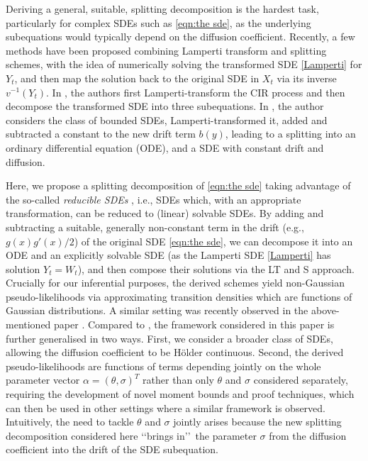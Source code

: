 \documentclass[a4paper,12pt]{article}
\numberwithin{equation}{section}
\theoremstyle{plain}
\theoremstyle{definition}
\begin{document}
Deriving a general, suitable, splitting decomposition is the hardest task, particularly for complex SDEs such as \eqref{eqn:the sde}, as the underlying subequations would typically depend on the diffusion coefficient. 
Recently, a few methods have been proposed combining Lamperti transform and splitting schemes, with the idea of numerically solving the transformed SDE \eqref{Lamperti} for $Y_t$, and then map the solution back to the original SDE in $X_t$ via its inverse $v^{-1}(Y_t)$. 
In \cite{kelly_adaptive_2023}, the authors first Lamperti-transform the CIR process and then decompose the transformed SDE into three subequations. In \cite{ulander_boundary-preserving_2024}, the author considers the class of bounded  SDEs, Lamperti-transformed it, added and subtracted a constant to the new drift term $b(y)$, leading to a splitting into an ordinary differential equation (ODE), and a SDE with constant drift and diffusion.

Here, we propose a splitting decomposition of \eqref{eqn:the sde} taking  advantage of 
the so-called \textit{reducible SDEs} \cite{kloeden_numerical_1992}, i.e., SDEs which, with an appropriate transformation, can be reduced to (linear) solvable SDEs. By adding and subtracting a suitable, generally non-constant term in the drift (e.g., $ g(x)g'(x)/2$) of the original SDE \eqref{eqn:the sde}, we can decompose it  into an ODE and an explicitly solvable SDE (as the Lamperti SDE \eqref{Lamperti} has solution  $Y_t=W_t$), and then compose their solutions via the LT and S approach. Crucially for our inferential purposes, the derived schemes yield non-Gaussian pseudo-likelihoods via approximating transition densities which are functions of Gaussian distributions. A similar setting was recently observed in the above-mentioned paper \cite{pilipovic_parameter_2024}. 
Compared to \cite{pilipovic_parameter_2024}, the framework considered in this paper is further generalised in two ways. First, we consider a broader class of SDEs, allowing the diffusion coefficient to be H\"older continuous. Second, the derived pseudo-likelihoods are functions of terms depending jointly on the whole parameter vector $\alpha=(\theta,\sigma)^T$ rather than only $\theta$ and $\sigma$ considered separately, requiring the development of novel moment bounds and proof techniques, which can then be used in other settings where a similar framework is observed. Intuitively, the need to tackle $\theta$ and $\sigma$ jointly arises because the new splitting decomposition considered here \lq\lq brings in\rq\rq\ the parameter $\sigma$ from the diffusion coefficient into the drift of the SDE subequation.
\end{document}
